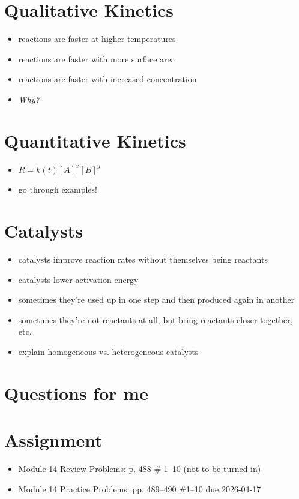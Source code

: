 \documentclass[10pt, oneside]{article}   	%
\begin{document}
\section*{Qualitative Kinetics}

\begin{itemize}
\item reactions are faster at higher temperatures
\item reactions are faster with more surface area
\item reactions are faster with increased concentration
\item \emph{Why?}
\end{itemize}

\section*{Quantitative Kinetics}

\begin{itemize}
\item $R = k(t)  [A]^{x}  [B]^{y}$
\item go through examples!
\end{itemize}

\section*{Catalysts}
\begin{itemize}
\item catalysts improve reaction rates without themselves being reactants
\item catalysts lower activation energy
\item sometimes they're used up in one step and then produced again in another
\item sometimes they're not reactants at all, but bring reactants closer together, etc.
\item explain homogeneous vs. heterogeneous catalysts
\end{itemize}

\section*{Questions for me}

\section*{Assignment}
\begin{itemize}
\item Module 14 Review Problems: p. 488 \# 1--10 (not to be turned in)
\item Module 14 Practice Problems: pp. 489--490 \#1--10 due 2026-04-17
\end{itemize}
\end{document}
